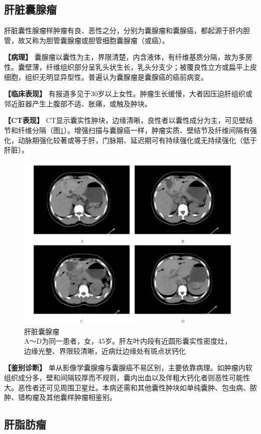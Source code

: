 \subsection{肝脏囊腺瘤}

肝脏囊性腺瘤样肿瘤有良、恶性之分，分别为囊腺瘤和囊腺癌，都起源于肝内胆管，故又称为胆管囊腺瘤或胆管细胞囊腺瘤（或癌）。

\textbf{【病理】}
囊腺瘤以囊性为主，界限清楚，内含液体，有纤维基质分隔，故为多房性。囊壁薄，纤维组织部分呈乳头状生长，乳头分支少；被覆良性立方或扁平上皮细胞，组织无明显异型性。普遍认为囊腺瘤是囊腺癌的癌前病变。

\textbf{【临床表现】}
有报道多见于30岁以上女性。肿瘤生长缓慢，大者因压迫肝组织或邻近脏器产生上腹部不适、胀痛，或触及肿块。

\textbf{【CT表现】}
CT显示囊实性肿块，边缘清晰，良性者以囊性成分为主，可见壁结节和纤维分隔（图\ref{fig11-9}）。增强扫描与囊腺癌一样，肿瘤实质、壁结节及纤维间隔有强化，动脉期强化较著或等于肝，门脉期、延迟期可有持续强化或无持续强化（低于肝脏）。

\begin{figure}[!htbp]
 \centering
 \includegraphics[width=.7\textwidth,height=\textheight,keepaspectratio]{./images/Image00281.jpg}
 \captionsetup{justification=centering}
 \caption{肝脏囊腺瘤\\{\small A～D为同一患者，女，45岁。肝左叶内段有近圆形囊实性密度灶，边缘光整、界限较清晰，近病灶边缘处有斑点状钙化}}
 \label{fig11-9}
  \end{figure} 

\textbf{【鉴别诊断】}
单从影像学囊腺瘤与囊腺癌不易区别，主要依靠病理。如肿瘤内软组织成分多，壁和间隔较厚而不规则，囊内出血以及伴粗大钙化者则恶性可能性大。恶性者还可见周围卫星灶。本病还需和其他囊性肿块如单纯囊肿、包虫病、脓肿、错构瘤及其他囊样肿瘤相鉴别。

\subsection{肝脂肪瘤}

